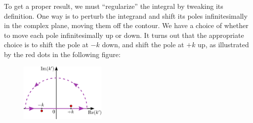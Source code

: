 \documentclass[pra,12pt]{revtex4}
\begin{document}
To get a proper result, we must ``regularize'' the integral by
tweaking its definition.  One way is to perturb the integrand and
shift its poles infinitesimally in the complex plane, moving them off
the contour.  We have a choice of whether to move each pole
infinitesimally up or down.  It turns out that the appropriate choice
is to shift the pole at $-k$ down, and shift the pole at $+k$ up, as
illustrated by the red dots in the following figure:

\begin{figure}[h!]
  \centering\includegraphics[width=0.37\textwidth]{greencontour}
\end{figure}
\end{document}
